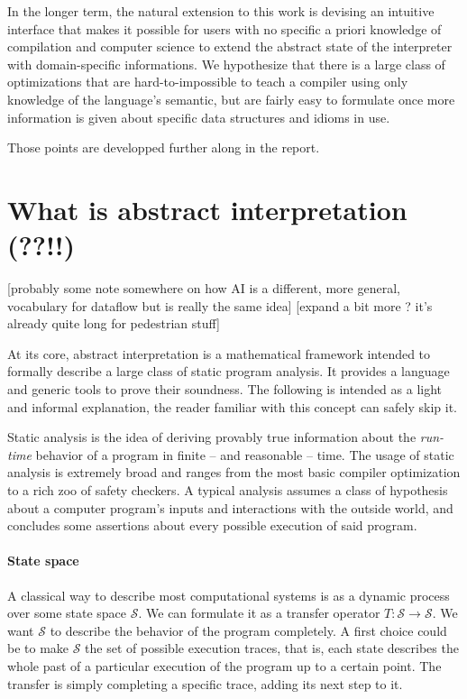 \documentclass[11pt]{article}
\renewcommand{\S}{\mathcal{S}}
\begin{document}
In the longer term, the natural extension to this work is devising an intuitive interface that makes it possible for users with no specific a priori knowledge of compilation and computer science to extend the abstract state of the interpreter with domain-specific informations. We hypothesize that there is a large class of optimizations that are hard-to-impossible to teach a compiler using only knowledge of the language's semantic, but are fairly easy to formulate once more information is given about specific data structures and idioms in use.

Those points are developped further along in the report.

\break

\section*{What is abstract interpretation (??!!)}

[probably some note somewhere on how AI is a different, more general, vocabulary for dataflow but is really the same idea]
[expand a bit more ? it's already quite long for pedestrian stuff]


At its core, abstract interpretation is a mathematical framework intended to formally describe a large class of static program analysis.
It provides a language and generic tools to prove their soundness.
The following is intended as a light and informal explanation, the reader familiar with this concept can safely skip it.

Static analysis is the idea of deriving provably true information about the \emph{run-time} behavior of a program in finite -- and reasonable -- time.
The usage of static analysis is extremely broad and ranges from the most basic compiler optimization to a rich zoo of safety checkers.
A typical analysis assumes a class of hypothesis about a computer program's inputs and interactions with the outside world, and concludes some assertions
about every possible execution of said program.

\paragraph{State space} A classical way to describe most computational systems is as a dynamic process over some state space $\S$. We can formulate it as a transfer operator $T:\S\to\S$. We want $\S$ to describe the behavior of the program completely. A first choice could be to make $\S$ the set of possible execution traces, that is, each state describes the whole past of a particular execution of the program up to a certain point. The transfer is simply completing a specific trace, adding its next step to it.
\end{document}
